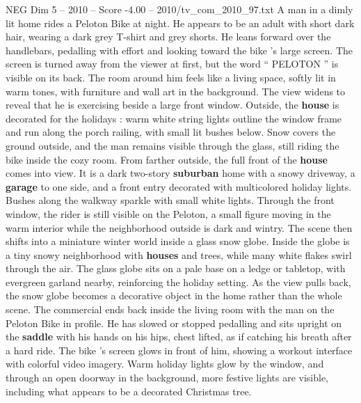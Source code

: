 \begin{textsample}{NEG Dim 5 – 2010 – Score -4.00 – 2010/tv\_com\_2010\_97.txt}  \label{ex:f5_neg_055}
A man in a dimly lit home rides a Peloton Bike at night.
He appears to be an adult with short dark hair, wearing a dark grey T-shirt and grey shorts.
He leans forward over the handlebars, pedalling with effort and looking toward the bike ’s large screen.
The screen is turned away from the viewer at first, but the word “ PELOTON ” is visible on its back.
The room around him feels like a living space, softly lit in warm tones, with furniture and wall art in the background.
The view widens to reveal that he is exercising beside a large front window.
Outside, the \textbf{house} is decorated for the holidays : warm white string lights outline the window frame and run along the porch railing, with small lit bushes below.
Snow covers the ground outside, and the man remains visible through the glass, still riding the bike inside the cozy room.
From farther outside, the full front of the \textbf{house} comes into view.
It is a dark two-story \textbf{suburban} home with a snowy driveway, a \textbf{garage} to one side, and a front entry decorated with multicolored holiday lights.
Bushes along the walkway sparkle with small white lights.
Through the front window, the rider is still visible on the Peloton, a small figure moving in the warm interior while the neighborhood outside is dark and wintry.
The scene then shifts into a miniature winter world inside a glass snow globe.
Inside the globe is a tiny snowy neighborhood with \textbf{houses} and trees, while many white flakes swirl through the air.
The glass globe sits on a pale base on a ledge or tabletop, with evergreen garland nearby, reinforcing the holiday setting.
As the view pulls back, the snow globe becomes a decorative object in the home rather than the whole scene.
The commercial ends back inside the living room with the man on the Peloton Bike in profile.
He has slowed or stopped pedalling and sits upright on the \textbf{saddle} with his hands on his hips, chest lifted, as if catching his breath after a hard ride.
The bike ’s screen glows in front of him, showing a workout interface with colorful video imagery.
Warm holiday lights glow by the window, and through an open doorway in the background, more festive lights are visible, including what appears to be a decorated Christmas tree.

\end{textsample}
